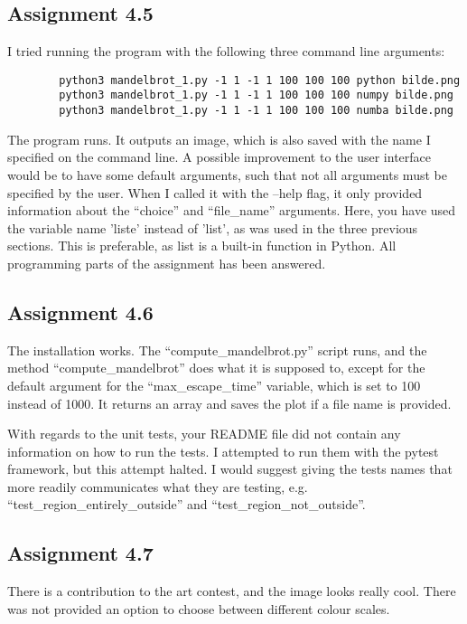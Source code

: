 \documentclass[a4paper]{article}
\begin{document}
    \subsection*{Assignment 4.5}
    I tried running the program with the following three command 
    line arguments:\\
    \begin{lstlisting}
        python3 mandelbrot_1.py -1 1 -1 1 100 100 100 python bilde.png
        python3 mandelbrot_1.py -1 1 -1 1 100 100 100 numpy bilde.png
        python3 mandelbrot_1.py -1 1 -1 1 100 100 100 numba bilde.png
    \end{lstlisting}
    The program runs. It outputs an image, which is also saved with 
    the name I specified on the command line. A possible improvement 
    to the user interface would be to have some default arguments, 
    such that not all arguments must be specified by the user. When
    I called it with the --help flag, it only provided information 
    about the ``choice'' and ``file\_name'' arguments.  Here, you have 
    used the variable name 'liste' instead of 'list', as was used in
    the three previous sections. This is preferable, as list is a 
    built-in function in Python. All programming parts of the 
    assignment has been answered. 

    \subsection*{Assignment 4.6}
    The installation works. The ``compute\_mandelbrot.py'' script runs,
    and the method ``compute\_mandelbrot'' does what it is supposed 
    to, except for the default argument for the  ``max\_escape\_time''
    variable, which is set to 100 instead of 1000. It returns an array 
    and saves the plot if a file name is provided.

    With regards to the unit tests, your README file did not contain
    any information on how to run the tests. I attempted to run them 
    with the pytest framework, but this attempt halted. I would suggest 
    giving the tests names that more readily communicates what they 
    are testing, e.g. 
    ``test\_region\_entirely\_outside'' and 
    ``test\_region\_not\_outside''.
    
    \subsection*{Assignment 4.7}
    There is a contribution to the art contest, and the image looks 
    really cool. There was not provided an option to choose between
    different colour scales.
    
\end{document}
